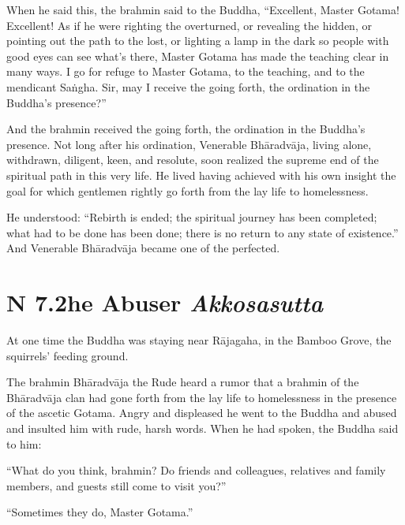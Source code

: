 \documentclass[12pt,openany]{book}%
\newcommand*{\suttatitleacronym}[1]{\smaller[2]{#1}\vspace*{.3em}}
\newcommand*{\suttatitletranslation}[1]{\linebreak{#1}}
\newcommand*{\suttatitleroot}[1]{\linebreak\smaller[2]\itshape{#1}}
\newcommand*{\tocacronym}[1]{\hspace*{-3.3em}{#1}\quad}
\newcommand*{\toctranslation}[1]{#1}
\newcommand*{\tocroot}[1]{(\textit{#1})}
\begin{document}
When he said this, the brahmin said to the Buddha, “Excellent, Master Gotama! Excellent! As if he were righting the overturned, or revealing the hidden, or pointing out the path to the lost, or lighting a lamp in the dark so people with good eyes can see what’s there, Master Gotama has made the teaching clear in many ways. I go for refuge to Master Gotama, to the teaching, and to the mendicant \textsanskrit{Saṅgha}. Sir, may I receive the going forth, the ordination in the Buddha’s presence?” 

And the brahmin received the going forth, the ordination in the Buddha’s presence. Not long after his ordination, Venerable \textsanskrit{Bhāradvāja}, living alone, withdrawn, diligent, keen, and resolute, soon realized the supreme end of the spiritual path in this very life. He lived having achieved with his own insight the goal for which gentlemen rightly go forth from the lay life to homelessness. 

He understood: “Rebirth is ended; the spiritual journey has been completed; what had to be done has been done; there is no return to any state of existence.” And Venerable \textsanskrit{Bhāradvāja} became one of the perfected. 

%
\section*{{\suttatitleacronym SN 7.2}{\suttatitletranslation The Abuser }{\suttatitleroot Akkosasutta}}
\addcontentsline{toc}{section}{\tocacronym{SN 7.2} \toctranslation{The Abuser } \tocroot{Akkosasutta}}

At one time the Buddha was staying near \textsanskrit{Rājagaha}, in the Bamboo Grove, the squirrels’ feeding ground. 

The brahmin \textsanskrit{Bhāradvāja} the Rude heard a rumor that a brahmin of the \textsanskrit{Bhāradvāja} clan had gone forth from the lay life to homelessness in the presence of the ascetic Gotama. Angry and displeased he went to the Buddha and abused and insulted him with rude, harsh words. When he had spoken, the Buddha said to him: 

“What do you think, brahmin? Do friends and colleagues, relatives and family members, and guests still come to visit you?” 

“Sometimes they do, Master Gotama.” 
\end{document}

